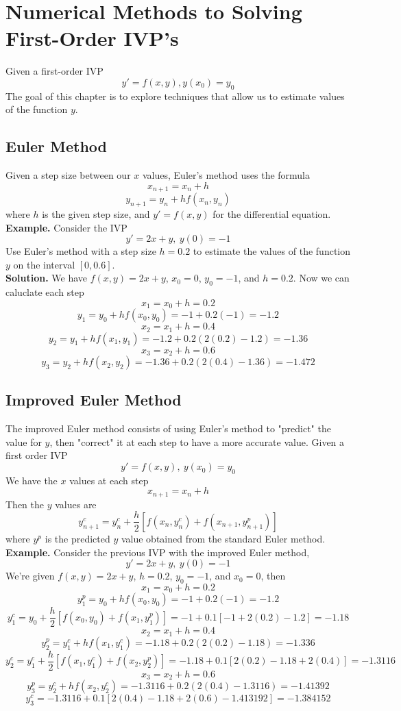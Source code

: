 \documentclass[openany]{report}
\begin{document}
\chapter{Numerical Methods to Solving First-Order IVP's}

Given a first-order IVP 
\[y' = f(x,y), y(x_0) = y_0\]
The goal of this chapter is to explore techniques that allow us to estimate values of the function $y$. 

\section{Euler Method}

Given a step size between our $x$ values, Euler's method uses the formula 
\[x_{n+1} = x_n + h\]
\[y_{n+1} = y_n + hf(x_n, y_n)\]
where $h$ is the given step size, and $y' = f(x,y)$ for the differential equation. \\[2ex]
\textbf{Example.} Consider the IVP 
\[y' = 2x + y, \ y(0) = -1\]
Use Euler's method with a step size $h = 0.2$ to estimate the values of the function $y$ on the interval $[0,0.6]$. \\[1ex]

\textbf{Solution.} We have $f(x,y) = 2x + y$, $x_0 = 0$, $y_0 = -1$, and $h = 0.2$. Now we can caluclate each step 
\[x_1 = x_0 + h = 0.2\]
\[y_1 = y_0 + h f(x_0,y_0) = -1 + 0.2(-1) = -1.2\]
\[x_2 = x_1 + h = 0.4\]
\[y_2 = y_1 + hf(x_1,y_1) = -1.2 + 0.2(2(0.2) - 1.2) = -1.36\]
\[x_3 = x_2 + h = 0.6\]
\[y_3 = y_2 + hf(x_2,y_2) = -1.36 + 0.2(2(0.4) - 1.36) = -1.472\]


\section{Improved Euler Method}

The improved Euler method consists of using Euler's method to "predict" the value for $y$, then "correct" it at each step to have a more accurate value. Given a first order IVP 
\[y' = f(x,y), \ y(x_0) = y_0\]
We have the $x$ values at each step 
\[x_{n+1} = x_n + h\]
Then the $y$ values are 
\[y^c_{n+1} = y_n^c + \frac{h}{2}\left[f(x_n,y_n^c) + f(x_{n+1}, y^p_{n+1})\right]\]
where $y^p$ is the predicted $y$ value obtained from the standard Euler method.\\[2ex]

\noindent
\textbf{Example.} Consider the previous IVP with the improved Euler method, 
\[y' = 2x+y, \ y(0) = -1\]
We're given $f(x,y) = 2x + y$, $h = 0.2$, $y_0 = -1$, and $x_0 = 0$, then 
\[x_1 = x_0 + h = 0.2\]
\[y_1^p = y_0 + h f(x_0, y_0) = -1 + 0.2(-1) = -1.2\] 
\[y_1^c = y_0 + \frac{h}{2}\left[f(x_0,y_0) + f(x_1,y_1^p)\right] = -1 + 0.1 \left[-1 + 2(0.2) - 1.2\right] = -1.18\]
\[x_2 = x_1 + h = 0.4\]
\[y_2^p = y_1^c + h f(x_1, y_1^c) = -1.18 + 0.2(2(0.2) - 1.18) = -1.336\]
\[y_2^c = y_1^c + \frac{h}{2}\left[f(x_1,y_1^c) + f(x_2,y_2^p)\right] = -1.18 + 0.1\left[2(0.2) - 1.18 + 2(0.4)\right] = -1.3116\]
\[x_3 = x_2 + h = 0.6\]
\[y_3^p = y_2^c + hf(x_2, y_2^c) = -1.3116 + 0.2(2(0.4) - 1.3116) = -1.41392\]
\[y_3^c = -1.3116 + 0.1\left[2(0.4) - 1.18 + 2(0.6) - 1.413192\right] = -1.384152\]
\end{document}
